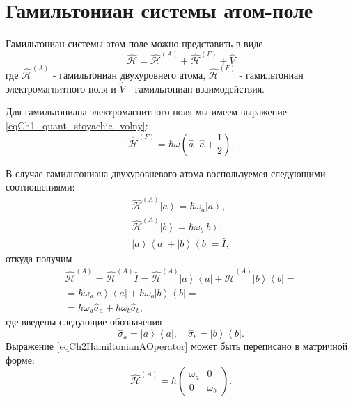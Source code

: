 \section{Гамильтониан системы атом-поле}
Гамильтониан системы атом-поле можно представить в виде
\begin{equation}
\hat{\mathcal{H}} = \hat{\mathcal{H}}^{(A)} +
\hat{\mathcal{H}}^{(F)} + \hat{V}
\nonumber
\end{equation}
где
$\hat{\mathcal{H}}^{(A)}$ - гамильтониан двухуровнего атома,
$\hat{\mathcal{H}}^{(F)}$ - гамильтониан электромагнитного поля и
$\hat{V}$ - гамильтониан взаимодействия.

Для гамильтониана электромагнитного поля мы имеем выражение
\eqref{eqCh1_quant_stoyachie_volny}:
\begin{equation}
\hat{\mathcal{H}}^{(F)} = \hbar \omega 
\left(\hat{a}^{+}\hat{a} + \frac{1}{2}\right).
\nonumber
\end{equation}

В случае гамильтониана двухуровневого атома воспользуемся следующими
соотношениями:
\begin{eqnarray}
\hat{\mathcal{H}}^{(A)}\left|a\right> = \hbar \omega_a \left|a\right>,
\nonumber \\
\hat{\mathcal{H}}^{(A)}\left|b\right> = \hbar \omega_b \left|b\right>,
\nonumber \\
\left|a\right>\left<a\right| + \left|b\right>\left<b\right| = \hat{I},
\nonumber
\end{eqnarray}
откуда получим
\begin{eqnarray}
\hat{\mathcal{H}}^{(A)} = \hat{\mathcal{H}}^{(A)}\hat{I} = 
\hat{\mathcal{H}}^{(A)}
\left|a\right>\left<a\right| + \hat{\mathcal{H}}^{(A)}
\left|b\right>\left<b\right| =
\nonumber \\
 = 
\hbar\omega_a
\left|a\right>\left<a\right| + \hbar\omega_b
\left|b\right>\left<b\right| =
\nonumber \\
= \hbar \omega_a \hat{\sigma}_a +
\hbar \omega_b \hat{\sigma}_b,
\label{eqCh2HamiltonianAOperator}
\end{eqnarray}
где введены следующие обозначения
\begin{equation}
\hat{\sigma}_a = \left|a\right>\left<a\right|,
\quad
\hat{\sigma}_b = \left|b\right>\left<b\right|.
\nonumber
\end{equation}
Выражение \eqref{eqCh2HamiltonianAOperator} может быть переписано в
матричной форме:
\begin{equation}
\hat{\mathcal{H}}^{(A)} = \hbar 
\left(
\begin{array} {cc}
\omega_a & 0  
\\
0 & \omega_b 
\end{array}
\right).
\label{eqCh2HamiltonianA}
\end{equation}

